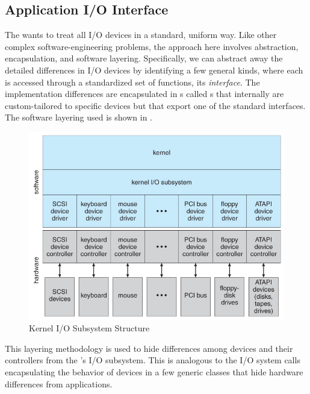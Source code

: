 \subsection{Application I/O Interface}\label{subsec:Application_IO_Interface}
The  wants to treat all I/O devices in a standard, uniform way.
Like other complex software-engineering problems, the approach here involves abstraction, encapsulation, and software layering.
Specifically, we can abstract away the detailed differences in I/O devices by identifying a few general kinds, where each is accessed through a standardized set of functions, its \emph{interface}.
The implementation differences are encapsulated in s called s that internally are custom-tailored to specific devices but that export one of the standard interfaces.
The software layering used is shown in .

\begin{figure}[h!tbp]
  \centering
  \includegraphics[scale=1.00]{./Drawings/EDAF35-Operating_Systems/Kernel_IO_Subsystem_Structure.jpg}
  \caption{Kernel I/O Subsystem Structure}
  \label{fig:Kernel_IO_Subsystem_Structure}
\end{figure}

This layering methodology is used to hide differences among devices and their controllers from the 's I/O subsystem.
This is analogous to the I/O system calls encapsulating the behavior of devices in a few generic classes that hide hardware differences from applications.

